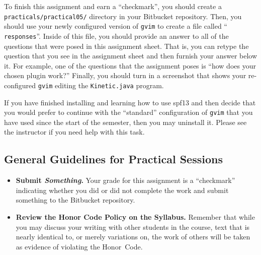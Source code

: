 To finish this assignment and earn a ``checkmark'', you should create a {\tt practicals/practical05/} directory in your
Bitbucket repository. Then, you should use your newly configured version of {\tt gvim} to create a file called ``{\tt
responses}''. Inside of this file, you should provide an answer to all of the questions that were posed in this
assignment sheet. That is, you can retype the question that you see in the assignment sheet and then furnish your answer
below it. For example, one of the questions that the assignment poses is ``how does your chosen plugin work?'' Finally,
you should turn in a screenshot that shows your re-configured {\tt gvim} editing the {\tt Kinetic.java} program.

If you have finished installing and learning how to use spf13 and then decide that you would prefer to continue with the
``standard'' configuration of {\tt gvim} that you have used since the start of the semester, then you may uninstall it.
Please see the instructor if you need help with this task.

\vspace*{-.15in}
\subsection*{General Guidelines for Practical Sessions}
\vspace*{-.05in}

\begin{itemize}

  \itemsep0in

\item {\bf Submit \textbf{\textit{Something}}.} Your grade for this assignment is a ``checkmark'' indicating whether you
  did or did not complete the work and submit something to the Bitbucket repository.



\item {\bf Review the Honor Code Policy on the Syllabus.} Remember that while you may discuss your writing with other
  students in the course, text that is nearly identical to, or merely variations on, the work of others will be
  taken as evidence of violating the \mbox{Honor Code}.

\end{itemize}


